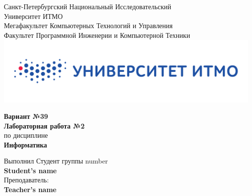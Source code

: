 \documentclass[12pt,onecolumn]{article}
\begin{document}
\setcounter{tocdepth}{4}
\begin{center}
    Санкт-Петербургский Национальный Исследовательский\\ 
    Университет ИТМО\\
    Мегафакультет Компьютерных Технологий и Управления\\
    Факультет Программной Инженерии и Компьютерной Техники \\
    \includegraphics[scale=0.3]{itm.jpg} %
\end{center}
\vspace{1cm}


\begin{center}
    \large \textbf{Вариант №39}\\
    \textbf{Лабораторная работа №2}\\
    по дисциплине\\
    \textbf{Информатика}
\end{center}

\vspace{2cm}

\begin{flushright}
  Выполнил Студент  группы number\\
  \textbf{Student's name}\\
  Преподаватель: \\
  \textbf{Teacher's name}\\
\end{flushright}
\end{document}
